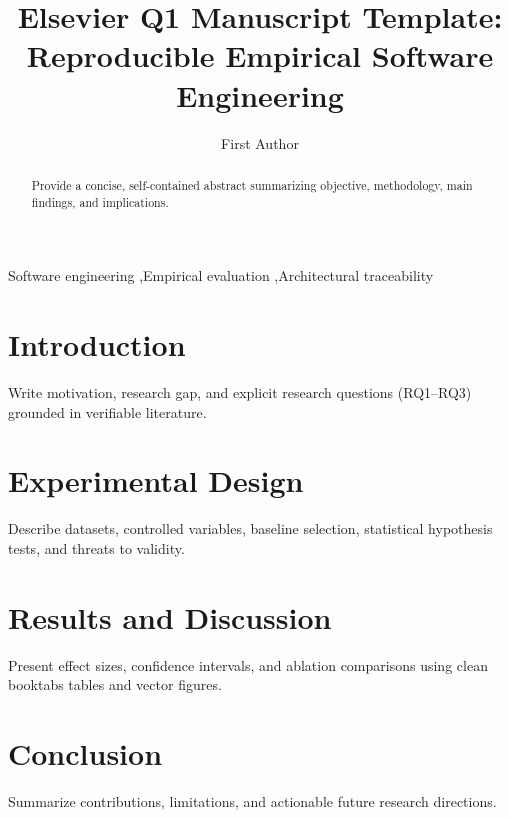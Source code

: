 \documentclass[preprint,12pt,authoryear]{elsarticle}
\begin{document}
\begin{frontmatter}

\title{Elsevier Q1 Manuscript Template: Reproducible Empirical Software Engineering}

\author[inst1]{First Author}

\begin{abstract}
Provide a concise, self-contained abstract summarizing objective, methodology, main findings, and implications.
\end{abstract}

\begin{keyword}
Software engineering \sep Empirical evaluation \sep Architectural traceability
\end{keyword}

\end{frontmatter}

\section{Introduction}
Write motivation, research gap, and explicit research questions (RQ1--RQ3) grounded in verifiable literature.

\section{Experimental Design}
Describe datasets, controlled variables, baseline selection, statistical hypothesis tests, and threats to validity.

\section{Results and Discussion}
Present effect sizes, confidence intervals, and ablation comparisons using clean booktabs tables and vector figures.

\section{Conclusion}
Summarize contributions, limitations, and actionable future research directions.
\end{document}
